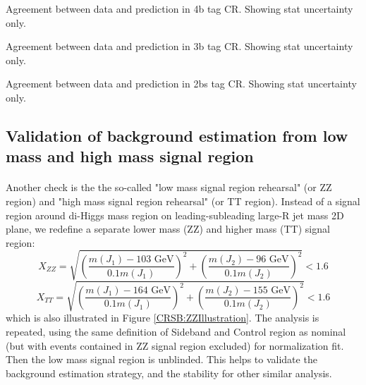 \begin{table}[htbp!]
\begin{center}

\end{center}
\caption{Agreement between data and prediction in 4b tag CR. Showing stat uncertainty only.}
\label{CRSB:Tab_4b_CR_Variations}
\end{table}

\begin{table}[htbp!]
\begin{center}

\end{center}
\caption{Agreement between data and prediction in 3b tag CR. Showing stat uncertainty only.}
\label{CRSB:Tab_3b_CR_Variations}
\end{table}
\begin{table}[htbp!]
\begin{center}

\end{center}
\caption{Agreement between data and prediction in 2bs tag CR. Showing stat uncertainty only.}
\label{CRSB:Tab_2bs_CR_Variations}
\end{table}


\clearpage
\subsection{Validation of background estimation from low mass and high mass signal region}
\label{sec:boosted-ZZ-Rehearsal}
\paragraph{}
Another check is the the so-called "low mass signal region rehearsal" (or ZZ region) and "high mass signal region rehearsal" (or TT region). Instead of a signal region around di-Higgs mass region on leading-subleading large-R jet mass 2D plane, we redefine a separate lower mass (ZZ) and higher mass (TT) signal region: 
\begin{equation}
X_{ZZ} = \sqrt{\left(\frac{m(J_1) - \text{103 GeV}}{0.1 m(J_1)}\right)^2 + \left(\frac{m(J_2) - \text{96 GeV}}{0.1 m(J_2)}\right)^2} < 1.6 
\label{eq:boosted_Xzz}
\end{equation}
\begin{equation}
X_{TT} = \sqrt{\left(\frac{m(J_1) - \text{164 GeV}}{0.1 m(J_1)}\right)^2 + \left(\frac{m(J_2) - \text{155 GeV}}{0.1 m(J_2)}\right)^2} < 1.6
\label{eq:boosted_Xtt}
\end{equation}
which is also illustrated in Figure \ref{CRSB:ZZIllustration}. The analysis is repeated, using the same definition of Sideband and Control region as nominal (but with events contained in ZZ signal region excluded) for normalization fit. Then the low mass signal region is unblinded. This helps to validate the background estimation strategy, and the stability for other similar analysis.

